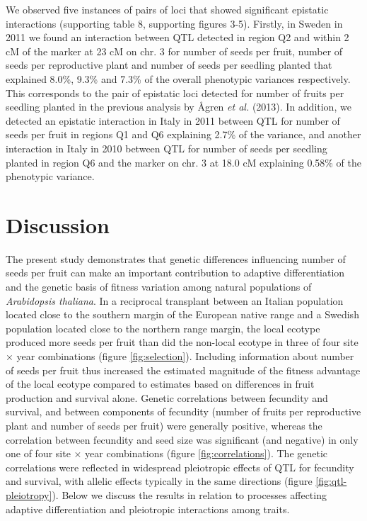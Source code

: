 \documentclass[12pt,]{article}
\begin{document}
We observed five instances of pairs of loci that showed significant epistatic interactions (supporting table 8, supporting figures 3-5).
Firstly, in Sweden in 2011 we found an interaction between QTL detected in region Q2 and within 2 cM of the marker at 23 cM on chr. 3 for number of seeds per fruit, number of seeds per reproductive plant and number of seeds per seedling planted that explained 8.0\%, 9.3\% and 7.3\% of the overall phenotypic variances respectively.
This corresponds to the pair of epistatic loci detected for number of fruits per seedling planted in the previous analysis by Ågren \emph{et al.} (2013).
In addition, we detected an epistatic interaction in Italy in 2011 between QTL for number of seeds per fruit in regions Q1 and Q6 explaining 2.7\% of the variance, and another interaction in Italy in 2010 between QTL for number of seeds per seedling planted in region Q6 and the marker on chr. 3 at 18.0 cM explaining 0.58\% of the phenotypic variance.

\hypertarget{discussion}{%
\section{Discussion}\label{discussion}}

The present study demonstrates that genetic differences influencing number of seeds per fruit can make an important contribution to adaptive differentiation and the genetic basis of fitness variation among natural populations of \emph{Arabidopsis thaliana}. In a reciprocal transplant between an Italian population located close to the southern margin of the European native range and a Swedish population located close to the northern range margin, the local ecotype produced more seeds per fruit than did the non-local ecotype in three of four site × year combinations (figure \ref{fig:selection}). Including information about number of seeds per fruit thus increased the estimated magnitude of the fitness advantage of the local ecotype compared to estimates based on differences in fruit production and survival alone. Genetic correlations between fecundity and survival, and between components of fecundity (number of fruits per reproductive plant and number of seeds per fruit) were generally positive, whereas the correlation between fecundity and seed size was significant (and negative) in only one of four site × year combinations (figure \ref{fig:correlations}). The genetic correlations were reflected in widespread pleiotropic effects of QTL for fecundity and survival, with allelic effects typically in the same directions (figure \ref{fig:qtl-pleiotropy}). Below we discuss the results in relation to processes affecting adaptive differentiation and pleiotropic interactions among traits.
\end{document}
